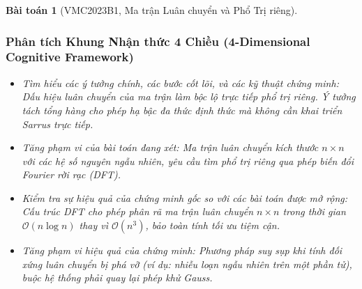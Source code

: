 \documentclass{article}
\newtheorem{baitoan}{Bài toán}
\begin{document}
\begin{baitoan}[VMC2023B1, Ma trận Luân chuyển và Phổ Trị riêng]
 \subsubsection*{Phân tích Khung Nhận thức 4 Chiều (4-Dimensional Cognitive Framework)}
 \begin{itemize}
 \item \textit{Tìm hiểu các ý tưởng chính, các bước cốt lõi, và các kỹ thuật chứng minh}: Dấu hiệu luân chuyển của ma trận làm bộc lộ trực tiếp phổ trị riêng. Ý tưởng tách tổng hàng cho phép hạ bậc đa thức định thức mà không cần khai triển Sarrus trực tiếp.
 \item \textit{Tăng phạm vi của bài toán đang xét}: Ma trận luân chuyển kích thước $n \times n$ với các hệ số nguyên ngẫu nhiên, yêu cầu tìm phổ trị riêng qua phép biến đổi Fourier rời rạc (DFT).
 \item \textit{Kiểm tra sự hiệu quả của chứng minh gốc so với các bài toán được mở rộng}: Cấu trúc DFT cho phép phân rã ma trận luân chuyển $n \times n$ trong thời gian $\mathcal{O}(n \log n)$ thay vì $\mathcal{O}(n^3)$, bảo toàn tính tối ưu tiệm cận.
 \item \textit{Tăng phạm vi hiệu quả của chứng minh}: Phương pháp suy sụp khi tính đối xứng luân chuyển bị phá vỡ (ví dụ: nhiễu loạn ngẫu nhiên trên một phần tử), buộc hệ thống phải quay lại phép khử Gauss.
 \end{itemize}
\end{baitoan}
\end{document}
